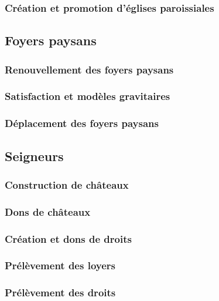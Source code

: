 	\subsubsection{Création et promotion d'églises paroissiales}

\subsection{Foyers paysans}
	\subsubsection{Renouvellement des foyers paysans}
	\subsubsection{Satisfaction et modèles gravitaires}
	\subsubsection{Déplacement des foyers paysans}

\subsection{Seigneurs}
	\subsubsection{Construction de châteaux}
	\subsubsection{Dons de châteaux}
	\subsubsection{Création et dons de droits}
	\subsubsection{Prélèvement des loyers}
	\subsubsection{Prélèvement des droits}

\printbibliography[title={Références}]
